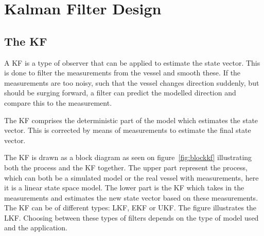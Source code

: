 \section{Kalman Filter Design}
\label{sec:kfdesign}

\subsection{The \acl{KF}}



A \ac{KF} is a type of observer that can be applied to estimate the state vector. This is done to filter the measurements from the vessel and smooth these. If the measurements are too noisy, such that the vessel changes direction suddenly, but should be surging forward, a filter can predict the modelled direction and compare this to the measurement.

The \ac{KF} comprises the deterministic part  of the model which estimates the state vector. This is corrected by means of measurements to estimate the final state vector.

The \ac{KF} is drawn as a block diagram as seen on figure~\vref{fig:blockkf} illustrating both the process and the \ac{KF} together. The upper part represent the process, which can both be a simulated model or the real vessel with measurements, here it is a linear state space model. The lower part is the \ac{KF} which takes in the measurements and estimates the new state vector based on these measurements. The \ac{KF} can be of different types: \ac{LKF}, \ac{EKF} or \ac{UKF}. The figure illustrates the \ac{LKF}. Choosing between these types of filters depends on the type of model used and the application. 


